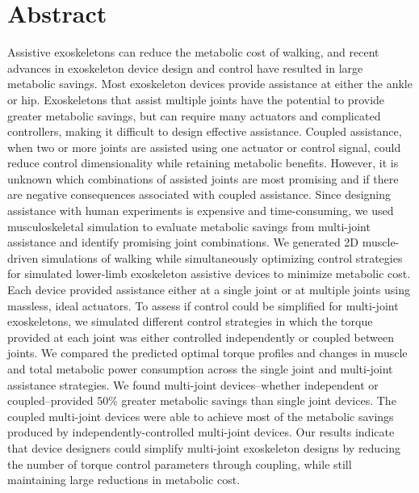 \documentclass[10pt,letterpaper]{article}
\begin{document}
\section*{Abstract}
Assistive exoskeletons can reduce the metabolic cost of walking, and recent advances in exoskeleton device design and control have resulted in large metabolic savings. Most exoskeleton devices provide assistance at either the ankle or hip. Exoskeletons that assist multiple joints have the potential to provide greater metabolic savings, but can require many actuators and complicated controllers, making it difficult to design effective assistance. Coupled assistance, when two or more joints are assisted using one actuator or control signal, could reduce control dimensionality while retaining metabolic benefits. However, it is unknown which combinations of assisted joints are most promising and if there are negative consequences associated with coupled assistance. Since designing assistance with human experiments is expensive and time-consuming, we used musculoskeletal simulation to evaluate metabolic savings from multi-joint assistance and identify promising joint combinations. We generated 2D muscle-driven simulations of walking while simultaneously optimizing control strategies for simulated lower-limb exoskeleton assistive devices to minimize metabolic cost. Each device provided assistance either at a single joint or at multiple joints using massless, ideal actuators. To assess if control could be simplified for multi-joint exoskeletons, we simulated different control strategies in which the torque provided at each joint was either controlled independently or coupled between joints. We compared the predicted optimal torque profiles and changes in muscle and total metabolic power consumption across the single joint and multi-joint assistance strategies. We found multi-joint devices--whether independent or coupled--provided 50\% greater metabolic savings than single joint devices. The coupled multi-joint devices were able to achieve most of the metabolic savings produced by independently-controlled multi-joint devices. Our results indicate that device designers could simplify multi-joint exoskeleton designs by reducing the number of torque control parameters through coupling, while still maintaining large reductions in metabolic cost. 

\linenumbers
\end{document}
